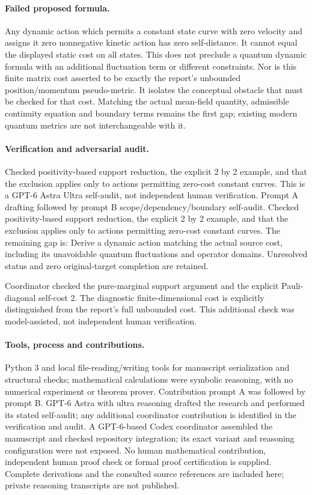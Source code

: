 \documentclass[11pt]{article}
\begin{document}
\paragraph{Failed proposed formula.} Any dynamic action which permits a constant state curve with zero velocity and assigns it zero nonnegative kinetic action has zero self-distance. It cannot equal the displayed static cost on all states. This does not preclude a quantum dynamic formula with an additional fluctuation term or different constraints. Nor is this finite matrix cost asserted to be exactly the report's unbounded position/momentum pseudo-metric. It isolates the conceptual obstacle that must be checked for that cost. Matching the actual mean-field quantity, admissible continuity equation and boundary terms remains the first gap; existing modern quantum metrics are not interchangeable with it.

\paragraph{Verification and adversarial audit.}
Checked positivity-based support reduction, the explicit 2 by 2 example, and that the exclusion applies only to actions permitting zero-cost constant curves. This is a GPT-6 Astra Ultra self-audit, not independent human verification. Prompt A drafting followed by prompt B scope/dependency/boundary self-audit. Checked positivity-based support reduction, the explicit 2 by 2 example, and that the exclusion applies only to actions permitting zero-cost constant curves. The remaining gap is: Derive a dynamic action matching the actual source cost, including its unavoidable quantum fluctuations and operator domains. Unresolved status and zero original-target completion are retained.

Coordinator checked the pure-marginal support argument and the explicit Pauli-diagonal self-cost 2. The diagnostic finite-dimensional cost is explicitly distinguished from the report's full unbounded cost. This additional check was model-assisted, not independent human verification.

\paragraph{Tools, process and contributions.}
Python 3 and local file-reading/writing tools for manuscript serialization and structural checks; mathematical calculations were symbolic reasoning, with no numerical experiment or theorem prover. Contribution prompt A was followed by prompt B. GPT-6 Astra with ultra reasoning drafted the research and performed its stated self-audit; any additional coordinator contribution is identified in the verification and audit. A GPT-6-based Codex coordinator assembled the manuscript and checked repository integration; its exact variant and reasoning configuration were not exposed. No human mathematical contribution, independent human proof check or formal proof certification is supplied. Complete derivations and the consulted source references are included here; private reasoning transcripts are not published.
\end{document}
